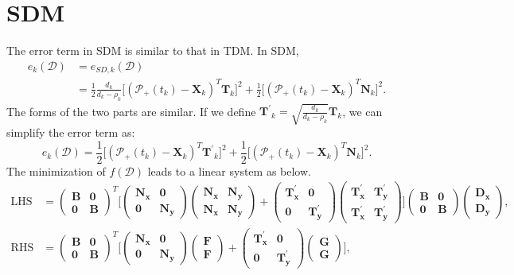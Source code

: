 \documentclass[11pt]{article}
\newcommand{\sd}{\mathcal{D}} %
\newcommand{\bmmpp}{\bm{\mathcal{P_+}}} %
\newcommand{\half}{\frac{1}{2}}
\newcommand{\vX}[1]{\bm{X}_{#1}} %
\newcommand{\vN}[1]{\bm{N}_{#1}} %
\newcommand{\vT}[1]{\bm{T}_{#1}} %
\newcommand{\vTp}[1]{\bm{T^{\prime}}_{#1}} %
\newcommand{\mB}{\mathbf{B}} %
\newcommand{\mz}{\mathbf{0}} %
\newcommand{\mF}{\mathbf{F}} %
\newcommand{\mG}{\mathbf{G}} %
\newcommand{\mNx}{\mathbf{N_x}} %
\newcommand{\mNy}{\mathbf{N_y}} %
\newcommand{\mTpx}{\mathbf{T^{\prime}_x}} %
\newcommand{\mTpy}{\mathbf{T^{\prime}_y}} %
\newcommand{\mDx}{\mathbf{D_x}} %
\newcommand{\mDy}{\mathbf{D_y}} %
\newcommand{\rhs}{\mathrm{RHS}}
\newcommand{\lhs}{\mathrm{LHS}}
\begin{document}
\section{SDM}
The error term in SDM is similar to that in TDM. In SDM,
\[
\begin{split}
e_k(\sd) &= e_{SD,k}(\sd) \\
&= \half\frac{d_k}{d_k-\rho_k}\big[(\bmmpp(t_k)-\vX{k})^T\vT{k}\big]^2 + \half\big[(\bmmpp(t_k)-\vX{k})^T\vN{k}\big]^2.
\end{split}
\]
The forms of the two parts are similar. If we define $\vTp{k}=\sqrt{\frac{d_k}{d_k-\rho_k}}\vT{k}$, we can simplify the error term as:
\[
e_k(\sd) = \half\big[(\bmmpp(t_k)-\vX{k})^T\vTp{k}\big]^2 + \half\big[(\bmmpp(t_k)-\vX{k})^T\vN{k}\big]^2.
\]
The minimization of $f(\sd)$ leads to a linear system as below.
\[
\begin{split}
\lhs &= 
\begin{pmatrix}
\mB & \mz \\
\mz & \mB
\end{pmatrix}^T
\Biggl[
\begin{pmatrix}
\mNx & \mz \\
\mz & \mNy
\end{pmatrix}
\begin{pmatrix}
\mNx & \mNy \\
\mNx & \mNy
\end{pmatrix}
+
\begin{pmatrix}
\mTpx & \mz \\
\mz & \mTpy
\end{pmatrix}
\begin{pmatrix}
\mTpx & \mTpy \\
\mTpx & \mTpy
\end{pmatrix}
\Biggr]
\begin{pmatrix}
\mB & \mz \\
\mz & \mB
\end{pmatrix}
\begin{pmatrix}
\mDx \\
\mDy 
\end{pmatrix},\\
\rhs &=
\begin{pmatrix}
\mB & \mz \\
\mz & \mB
\end{pmatrix}^T
\Biggl[
\begin{pmatrix}
\mNx & \mz \\
\mz & \mNy
\end{pmatrix}
\begin{pmatrix}
\mF \\
\mF 
\end{pmatrix}
+
\begin{pmatrix}
\mTpx & \mz \\
\mz & \mTpy
\end{pmatrix}
\begin{pmatrix}
\mG \\
\mG 
\end{pmatrix}
\Biggr],
\end{split}
\]
\end{document}
